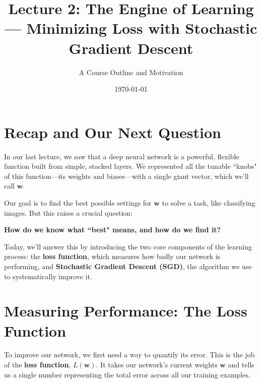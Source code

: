 \documentclass[11pt, a4paper]{article}
\title{Lecture 2: The Engine of Learning — Minimizing Loss with Stochastic Gradient Descent}
\author{A Course Outline and Motivation}
\date{\today}
\begin{document}
\maketitle
\thispagestyle{empty}
\tableofcontents
\newpage

\section{Recap and Our Next Question}
In our last lecture, we saw that a deep neural network is a powerful, flexible function built from simple, stacked layers. We represented all the tunable ``knobs" of this function—its weights and biases—with a single giant vector, which we'll call $\mathbf{w}$.

Our goal is to find the best possible settings for $\mathbf{w}$ to solve a task, like classifying images. But this raises a crucial question:
\begin{center}
\Large\textbf{How do we know what ``best" means, and how do we find it?}
\end{center}
Today, we'll answer this by introducing the two core components of the learning process: the \textbf{loss function}, which measures how badly our network is performing, and \textbf{Stochastic Gradient Descent (SGD)}, the algorithm we use to systematically improve it.

\section{Measuring Performance: The Loss Function}
To improve our network, we first need a way to quantify its error. This is the job of the \textbf{loss function}, $L(\mathbf{w})$. It takes our network's current weights $\mathbf{w}$ and tells us a single number representing the total error across all our training examples.
\end{document}
